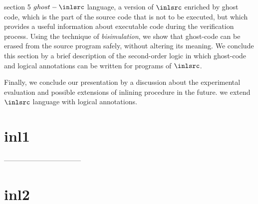 	 section 5 $ghost-\inlsrc$ language, a version of $\inlsrc$ enriched by ghost code, which is the part of the source code that is not to be executed, but which provides a useful information about executable code during the verification process.
 Using the technique of \textit{bisimulation}, we show that ghost-code can be erased from the source program safely, without altering its meaning.  
	We conclude this section by a brief description of the second-order logic in which  ghost-code and logical annotations can be written for programs of  $\inlsrc$.

 Finally, we conclude our presentation by a discussion about the experimental evaluation and possible extensions of inlining procedure in the future.
we extend $\inlsrc$ language with logical annotations.  

\section*{inl1}

%
%
%
%	
%	
%	
---------------------------------
\section{inl2}

